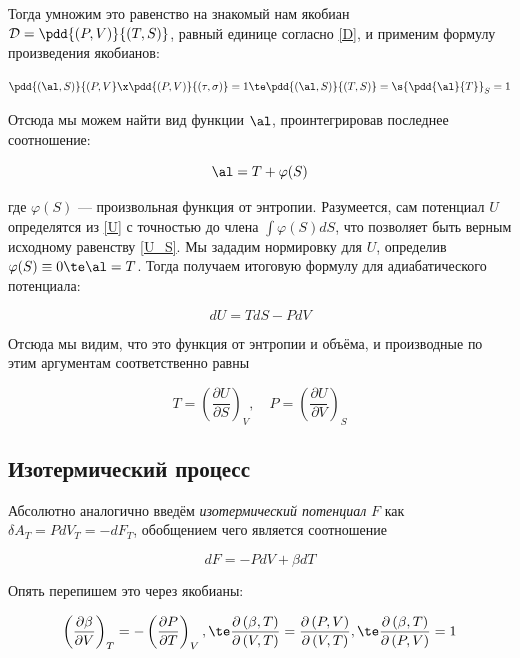 \documentclass[12pt]{kiarticle}
\newcommand{\del}{\ensuremath{\delta}}
\newcommand{\D}{\ensuremath{\mathcal{D}}}
\newcommand{\spdd}[2]{\left( \frac{\partial #1}{\partial #2} \right)}
\newcommand{\Dd}[4]{\frac{\partial \left( #1, #2\right) }{\partial \left( #3, #4\right)}}
\begin{document}
Тогда умножим это равенство на знакомый нам якобиан $ \D  = \pdd{(P, V)}{(T, S)} $, равный единице согласно \eqref{D}, и применим формулу произведения якобианов:

\begin{equation}\label{}
\pdd{(\al, S)}{(P, V} \x  \pdd{(P, V)}{(\tau, \sigma)} = 1 \te \pdd{(\al, S)}{(T, S)} = \s{\pdd{\al}{T}}_S = 1
\end{equation}

Отсюда мы можем найти вид функции $ \al $, проинтегрировав последнее соотношение:

\begin{equation}\label{}
\al = T + \varphi(S)
\end{equation}

где $ \varphi(S) $ --- произвольная функция от энтропии. Разумеется, сам потенциал $ U $ определятся из \eqref{U} с точностью до члена $ \int \varphi(S)dS $, что позволяет быть верным исходному равенству \eqref{U_S}. Мы зададим нормировку для $ U $, определив $ \varphi(S) \equiv 0 \te \al = T $. Тогда получаем итоговую формулу для адиабатического потенциала:

\begin{equation}\label{U =}
dU = TdS - PdV
\end{equation}

Отсюда мы видим, что это функция от энтропии и объёма, и производные по этим аргументам соответственно равны 

\begin{equation}\label{}
T = \spdd{U}{S}_V, \quad P = \spdd{U}{V}_S
\end{equation}

\subsection{Изотермический процесс}

Абсолютно аналогично введём \textit{изотермический потенциал} $ F $ как $ \del A_T = P dV_T = - dF_T $, обобщением чего является соотношение

\begin{equation}\label{F}
dF = -PdV + \beta dT
\end{equation}

Опять перепишем это через якобианы: 

\begin{equation}\label{}
\spdd{\beta}{V}_T = - \spdd{P}{T}_V , \te \Dd{\beta}{T}{V}{T} = \Dd{P}{V}{V}{T} ,  \te \Dd{\beta}{T}{P}{V} = 1
\end{equation}
\end{document}

